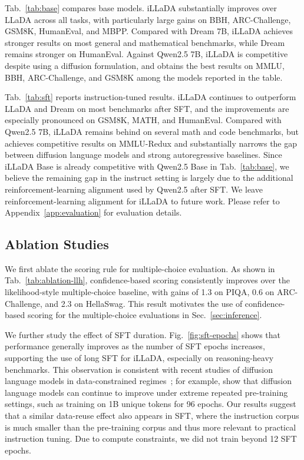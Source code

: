 \documentclass{llmxive}
\begin{document}
Tab.~\ref{tab:base} compares base models. iLLaDA substantially improves over LLaDA across all tasks, with particularly large gains on BBH, ARC-Challenge, GSM8K, HumanEval, and MBPP. Compared with Dream 7B, iLLaDA achieves stronger results on most general and mathematical benchmarks, while Dream remains stronger on HumanEval. Against Qwen2.5 7B, iLLaDA is competitive despite using a diffusion formulation, and obtains the best results on MMLU, BBH, ARC-Challenge, and GSM8K among the models reported in the table.




Tab.~\ref{tab:sft} reports instruction-tuned results. iLLaDA continues to outperform LLaDA and Dream on most benchmarks after SFT, and the improvements are especially pronounced on GSM8K, MATH, and HumanEval. Compared with Qwen2.5 7B, iLLaDA remains behind on several math and code benchmarks, but achieves competitive results on MMLU-Redux and substantially narrows the gap between diffusion language models and strong autoregressive baselines. Since iLLaDA Base is already competitive with Qwen2.5 Base in Tab.~\ref{tab:base}, we believe the remaining gap in the instruct setting is largely due to the additional reinforcement-learning alignment used by Qwen2.5 after SFT. We leave reinforcement-learning alignment for iLLaDA to future work. Please refer to Appendix~\ref{app:evaluation} for evaluation details.





\subsection{Ablation Studies}
\label{sec:ablation}

We first ablate the scoring rule for multiple-choice evaluation. As shown in Tab.~\ref{tab:ablation-llh}, confidence-based scoring consistently improves over the likelihood-style multiple-choice baseline, with gains of 1.3 on PIQA, 0.6 on ARC-Challenge, and 2.3 on HellaSwag. This result motivates the use of confidence-based scoring for the multiple-choice evaluations in Sec.~\ref{sec:inference}.



We further study the effect of SFT duration. Fig.~\ref{fig:sft-epochs} shows that performance generally improves as the number of SFT epochs increases, supporting the use of long SFT for iLLaDA, especially on reasoning-heavy benchmarks. This observation is consistent with recent studies of diffusion language models in data-constrained regimes~\citep{prabhudesai2025diffusion,ni2025diffusion}; for example, \citet{ni2025diffusion} show that diffusion language models can continue to improve under extreme repeated pre-training settings, such as training on 1B unique tokens for 96 epochs. Our results suggest that a similar data-reuse effect also appears in SFT, where the instruction corpus is much smaller than the pre-training corpus and thus more relevant to practical instruction tuning. Due to compute constraints, we did not train beyond 12 SFT epochs.
\end{document}
